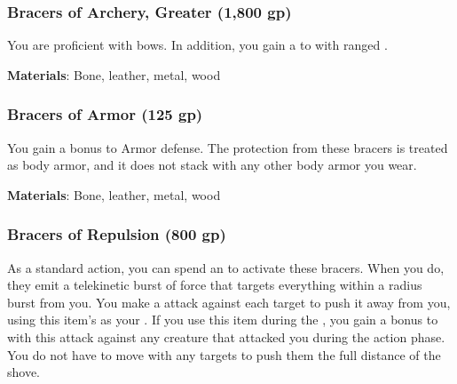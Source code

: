 \lowercase{\hypertarget{item:Bracers of Archery, Greater}{}}\label{item:Bracers of Archery, Greater}
\hypertarget{item:Bracers of Archery, Greater}{\subsubsection{Bracers of Archery, Greater\hfill{} (1,800 gp)}}

You are proficient with bows.
In addition, you gain a   to  with ranged .



\vspace{0.25em}
\textbf{Materials}: Bone, leather, metal, wood


\lowercase{\hypertarget{item:Bracers of Armor}{}}\label{item:Bracers of Armor}
\hypertarget{item:Bracers of Armor}{\subsubsection{Bracers of Armor\hfill{} (125 gp)}}

You gain a  bonus to Armor defense.
The protection from these bracers is treated as body armor, and it does not stack with any other body armor you wear.



\vspace{0.25em}
\textbf{Materials}: Bone, leather, metal, wood


\lowercase{\hypertarget{item:Bracers of Repulsion}{}}\label{item:Bracers of Repulsion}
\hypertarget{item:Bracers of Repulsion}{\subsubsection{Bracers of Repulsion\hfill{} (800 gp)}}

As a standard action, you can spend an  to activate these bracers.
When you do, they emit a telekinetic burst of force that targets everything within a \areamed radius burst from you.
You make a  attack against each target to push it away from you, using this item's  as your .
If you use this item during the ,
you gain a  bonus to  with this attack against any creature that attacked you during the action phase.
You do not have to move with any targets to push them the full distance of the shove.



